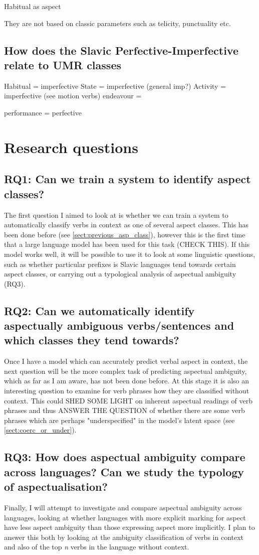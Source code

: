 Habitual as aspect

They are not based on classic parameters such as telicity, punctuality etc.

\subsection{How does the Slavic Perfective-Imperfective relate to UMR classes}

Habitual = imperfective
State = imperfective (general imp?)
Activity = imperfective (see motion verbs)
endeavour = 

performance = perfective
\section{Research questions}
\subsection*{RQ1: Can we train a system to identify aspect classes?}
The first question I aimed to look at is whether we can train a system to automatically classify verbs in context as one of several aspect classes. This has been done before (see \ref{sect:previous_asp_class}), however this is the first time that a large language model has been used for this task (CHECK THIS). If this model works well, it will be possible to use it to look at some linguistic questions, such as whether particular prefixes is Slavic languages tend towards certain aspect classes, or carrying out a typological analysis of aspectual ambiguity (RQ3). 
\subsection*{RQ2: Can we automatically identify aspectually ambiguous verbs/sentences and which classes they tend towards?}
Once I have a model which can accurately predict verbal aspect in context, the next question will be the more complex task of predicting aspectual ambiguity, which as far as I am aware, has not been done before. At this stage it is also an interesting question to examine for verb phrases how they are classified without context. This could SHED SOME LIGHT on inherent aspectual readings of verb phrases and thus ANSWER THE QUESTION of whether there are some verb phrases which are perhaps "underspecified" in the model's latent space (see \ref{sect:coerc_or_under}).
\subsection*{RQ3: How does aspectual ambiguity compare across languages? Can we study the typology of aspectualisation?}
Finally, I will attempt to investigate and compare aspectual ambiguity across languages, looking at whether languages with more explicit marking for aspect have less aspect ambiguity than those expressing aspect more implicitly. I plan to answer this both by looking at the ambiguity classification of verbs in context and also of the top \emph{n} verbs in the language without context.
